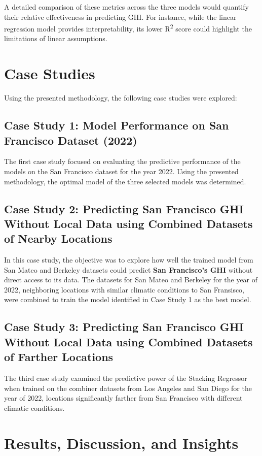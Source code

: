 \documentclass[10pt,twocolumn]{article}
\begin{document}
\begin{itemize}
A detailed comparison of these metrics across the three models would quantify their relative effectiveness in predicting GHI. For instance, while the linear regression model provides interpretability, its lower R\textsuperscript{2} score could highlight the limitations of linear assumptions.
\section{Case Studies}

Using the presented methodology, the following case studies were explored:

\subsection{Case Study 1: Model Performance on San Francisco Dataset (2022)}
The first case study focused on evaluating the predictive performance of the models on the {San Francisco dataset for the year 2022}. Using the presented methodology, the optimal model of the three selected models was determined. 

\subsection{Case Study 2: Predicting San Francisco GHI Without Local Data using Combined Datasets of Nearby Locations}

In this case study, the objective was to explore how well the trained model from {San Mateo and Berkeley datasets} could predict \textbf{San Francisco's GHI} without direct access to its data. The datasets for San Mateo and Berkeley for the year of 2022, neighboring locations with similar climatic conditions to San Fransisco, were combined to train the model identified in Case Study 1 as the best model. 


\subsection{Case Study 3: Predicting San Francisco GHI Without Local Data using Combined Datasets of Farther Locations}

The third case study examined the predictive power of the Stacking Regressor when trained on the combiner datasets from Los Angeles and San Diego for the year of 2022, locations significantly farther from San Francisco with different climatic conditions.




\section{Results, Discussion, and Insights}

\end{itemize}
\end{document}
